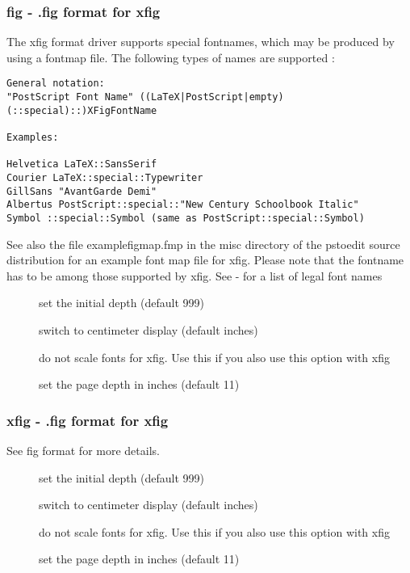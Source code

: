 \documentclass[english,a4paper]{article}
\begin{document}
\subsubsection{fig - .fig format for xfig}
The xfig format driver supports special fontnames, which may be produced by using a fontmap file. The following types of names are supported :\\
\begin{verbatim}
General notation:
"PostScript Font Name" ((LaTeX|PostScript|empty)(::special)::)XFigFontName

Examples:

Helvetica LaTeX::SansSerif
Courier LaTeX::special::Typewriter
GillSans "AvantGarde Demi"
Albertus PostScript::special::"New Century Schoolbook Italic"
Symbol ::special::Symbol (same as PostScript::special::Symbol)
\end{verbatim}
See also the file examplefigmap.fmp in the misc directory of the pstoedit source distribution for an example font map file for xfig. Please note that the fontname has to be among those supported by xfig. See -  for a list of legal font names

\begin{description}
\item[]
set the initial depth (default 999)


\item[]
switch to centimeter display (default inches)


\item[]
do not scale fonts for xfig. Use this if you also use this option with xfig


\item[]
set the page depth in inches (default 11)


\end{description}
\subsubsection{xfig - .fig format for xfig}
See fig format for more details.

\begin{description}
\item[]
set the initial depth (default 999)


\item[]
switch to centimeter display (default inches)


\item[]
do not scale fonts for xfig. Use this if you also use this option with xfig


\item[]
set the page depth in inches (default 11)


\end{description}
\end{document}
